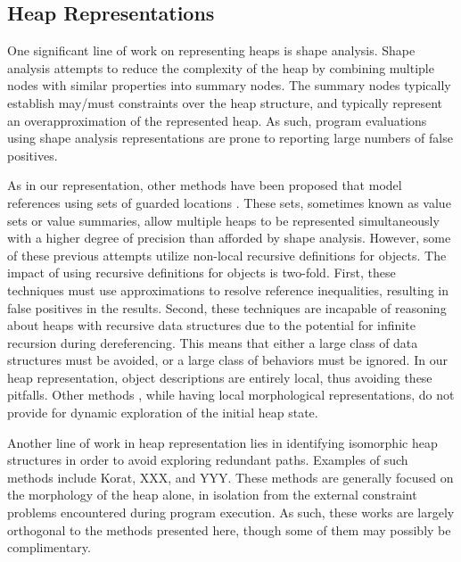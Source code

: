 \subsection{Heap Representations}
One significant line of work on representing heaps is shape analysis. Shape analysis attempts to reduce the complexity of the heap by combining multiple nodes with similar properties into summary nodes. The summary nodes typically establish may/must constraints over the heap structure, and typically represent an overapproximation of the represented heap. As such, program evaluations using shape analysis representations are prone to reporting large numbers of false positives.

As in our representation, other methods have been proposed that model references using sets of guarded locations \cite{Xie:2005,Cherem:2007,Dillig:2011,Sen:2014}. These sets, sometimes known as value sets or value summaries, allow multiple heaps to be represented simultaneously with a higher degree of precision than afforded by shape analysis. However, some of these previous attempts  \cite{Xie:2005,Cherem:2007} utilize non-local recursive definitions for objects. The impact of using recursive definitions for objects is two-fold. First, these techniques must use approximations to resolve reference inequalities, resulting in false positives in the results. Second, these techniques are incapable of reasoning about heaps with recursive data structures due to the potential for infinite recursion during dereferencing. This means that either a large class of data structures must be avoided, or a large class of behaviors must be ignored. In our heap representation, object descriptions are entirely local, thus avoiding these pitfalls. Other methods  \cite{Dillig:2011,Sen:2014}, while having local morphological representations, do not provide for dynamic exploration of the initial heap state. 

Another line of work in heap representation lies in identifying isomorphic heap structures in order to avoid exploring redundant paths. Examples of such methods include Korat, XXX, and YYY. These methods are generally focused on the morphology of the heap alone, in isolation from the external constraint problems encountered during program execution. As such, these works are largely orthogonal to the methods presented here, though some of them may possibly be complimentary.